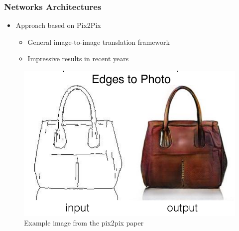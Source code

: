 \documentclass[18pt, xcolor=table]{beamer}
\begin{document}
\begin{frame}[t]
  \frametitle{Networks Architectures}
  \begin{itemize}
  \item Approach based on Pix2Pix\footnotemark
    \begin{itemize}
    \item General image-to-image translation framework
    \item Impressive results in recent years
    \end{itemize}
  \end{itemize}

  \begin{center}
    \begin{figure}[htb]
      \includegraphics[scale=0.23]{images/pix2pix_example}
      \caption{Example image from the pix2pix paper}
    \end{figure}
  \end{center}

\end{frame}
\end{document}
